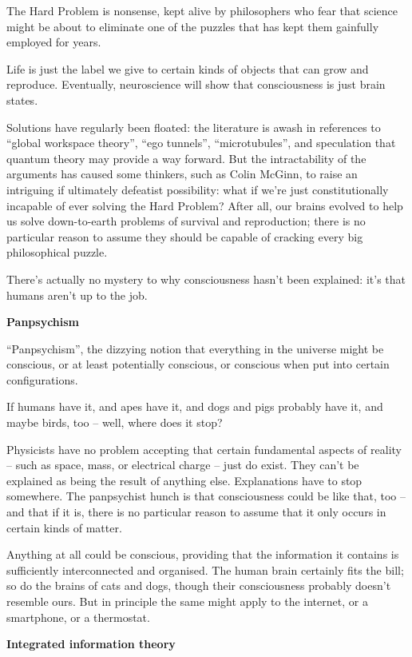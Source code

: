 \documentclass[
]{book}
\begin{document}
The Hard Problem is nonsense, kept alive by philosophers who fear that science might be about to eliminate one of the puzzles that has kept them gainfully employed for years.

Life is just the label we give to certain kinds of objects that can grow and reproduce.
Eventually, neuroscience will show that consciousness is just brain states.

Solutions have regularly been floated: the literature is awash in references to ``global workspace theory'', ``ego tunnels'', ``microtubules'', and speculation that quantum theory may provide a way forward. But the intractability of the arguments has caused some thinkers, such as Colin McGinn, to raise an intriguing if ultimately defeatist possibility: what if we're just constitutionally incapable of ever solving the Hard Problem? After all, our brains evolved to help us solve down-to-earth problems of survival and reproduction; there is no particular reason to assume they should be capable of cracking every big philosophical puzzle.

There's actually no mystery to why consciousness hasn't been explained: it's that humans aren't up to the job.

\textbf{Panpsychism}

``Panpsychism'', the dizzying notion that everything in the universe might be conscious, or at least potentially conscious, or conscious when put into certain configurations.

If humans have it, and apes have it, and dogs and pigs probably have it, and maybe birds, too -- well, where does it stop?

Physicists have no problem accepting that certain fundamental aspects of reality -- such as space, mass, or electrical charge -- just do exist. They can't be explained as being the result of anything else. Explanations have to stop somewhere. The panpsychist hunch is that consciousness could be like that, too -- and that if it is, there is no particular reason to assume that it only occurs in certain kinds of matter.

Anything at all could be conscious, providing that the information it contains is sufficiently interconnected and organised. The human brain certainly fits the bill; so do the brains of cats and dogs, though their consciousness probably doesn't resemble ours. But in principle the same might apply to the internet, or a smartphone, or a thermostat.

\textbf{Integrated information theory}
\end{document}
